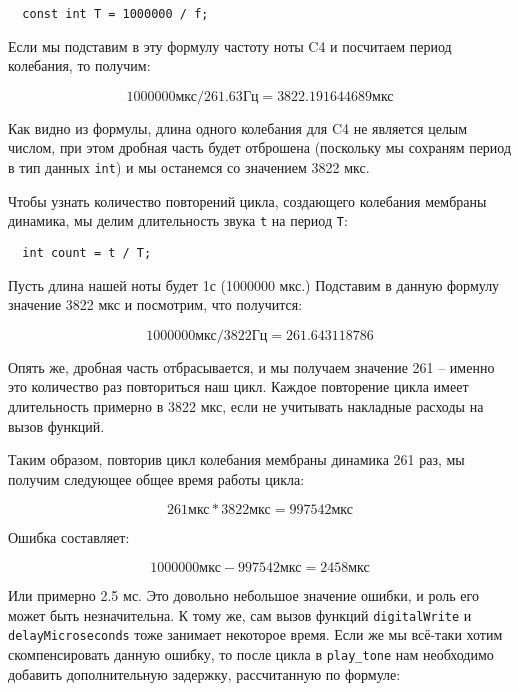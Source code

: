 \documentclass[../sparc.tex]{subfiles}
\begin{document}
\begin{verbatim}
  const int T = 1000000 / f;
\end{verbatim}

Если мы подставим в эту формулу частоту ноты C4 и посчитаем период колебания, то
получим:

\begin{equation}
  1000000 \mbox{мкс} / 261.63 \mbox{Гц} = 3822.191644689 \mbox{мкс}
\end{equation}

Как видно из формулы, длина одного колебания для C4 не является целым числом,
при этом дробная часть будет отброшена (поскольку мы сохраням период в тип
данных \texttt{int}) и мы останемся со значением 3822 мкс.

Чтобы узнать количество повторений цикла, создающего колебания мембраны
динамика, мы делим длительность звука \texttt{t} на период \texttt{T}:

\begin{verbatim}
  int count = t / T;
\end{verbatim}

Пусть длина нашей ноты будет 1с (1000000 мкс.)  Подставим в данную формулу
значение 3822 мкс и посмотрим, что получится:

\begin{equation}
  1000000 \mbox{мкс} / 3822 \mbox{Гц} = 261.643118786
\end{equation}

Опять же, дробная часть отбрасывается, и мы получаем значение 261 -- именно это
количество раз повториться наш цикл.  Каждое повторение цикла имеет длительность
примерно в 3822 мкс, если не учитывать накладные расходы на вызов функций.

Таким образом, повторив цикл колебания мембраны динамика 261 раз, мы получим
следующее общее время работы цикла:

\begin{equation}
  261 \mbox{мкс} * 3822 \mbox{мкс} = 997542 \mbox{мкс}
\end{equation}

Ошибка составляет:

\begin{equation}
  1000000 \mbox{мкс} - 997542 \mbox{мкс} = 2458 \mbox{мкс}
\end{equation}

Или примерно 2.5 мс.  Это довольно небольшое значение ошибки, и роль его может
быть незначительна.  К тому же, сам вызов функций \texttt{digitalWrite} и
\texttt{delayMicroseconds} тоже занимает некоторое время.  Если же мы всё-таки
хотим скомпенсировать данную ошибку, то после цикла в \texttt{play\_tone} нам
необходимо добавить дополнительную задержку, рассчитанную по формуле:
\end{document}
